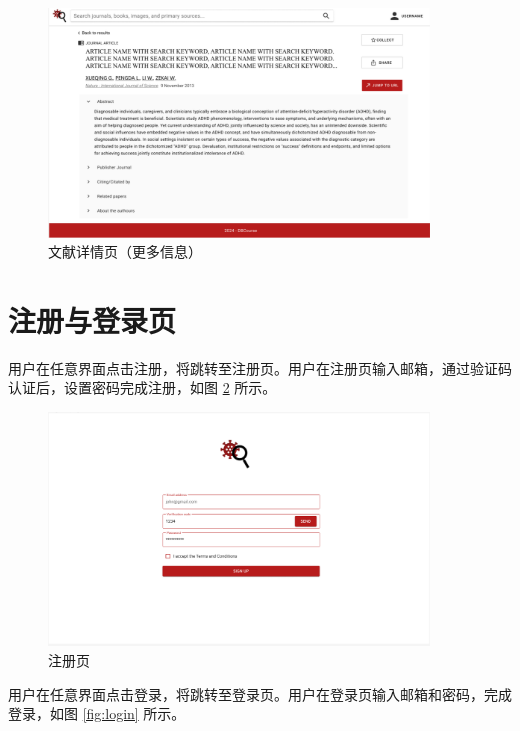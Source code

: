 \documentclass[UTF8,openany]{ctexbook}
\begin{document}
\begin{figure}[H]
\centering
\includegraphics[width=0.9\textwidth]{img/5.png}
\caption{文献详情页（更多信息）}
\label{fig:detail-more}
\end{figure}

\section{注册与登录页}

用户在任意界面点击注册，将跳转至注册页。用户在注册页输入邮箱，通过验证码认证后，设置密码完成注册，如图 \ref{fig:register} 所示。

\begin{figure}[H]
\centering
\includegraphics[width=0.9\textwidth]{img/7.png}
\caption{注册页}
\label{fig:register}
\end{figure}

用户在任意界面点击登录，将跳转至登录页。用户在登录页输入邮箱和密码，完成登录，如图 \ref{fig:login} 所示。
\end{document}
